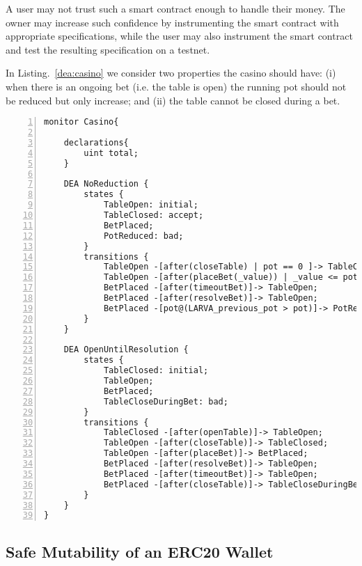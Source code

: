 \documentclass{article}
\newcommand{\tildearrow}{{\raise.37ex\hbox{$\scriptstyle\mathtt{\sim}$}}\hspace{-0.08cm}>\xspace}
\begin{document}
      A user may not trust such a smart contract enough to handle their money. The owner may increase such confidence by instrumenting the smart contract with appropriate specifications, while the user may also instrument the smart contract and test the resulting specification on a testnet.
      
      In Listing.~\ref{dea:casino} we consider two properties the casino should have: (i) when there is an ongoing bet (i.e. the table is open) the running pot should not be reduced but only increase; and (ii) the table cannot be closed during a bet.
      
        \small\begin{lstlisting}[language=DEA,basicstyle=\scriptsize,numbers=left,numbersep=2pt,xleftmargin=0.3cm,escapechar=\%,label={dea:casino},caption={Monitors that check: (i) that a game's \texttt{pot} is increasing; and (ii) a game is open until it is resolved.}]
monitor Casino{

    declarations{
        uint total;
    }

    DEA NoReduction {
        states {
            TableOpen: initial;
            TableClosed: accept;
            BetPlaced;
            PotReduced: bad;
        }
        transitions {
            TableOpen -[after(closeTable) | pot == 0 ]-> TableClosed;
            TableOpen -[after(placeBet(_value)) | _value <= pot %$\tildearrow$% total += _value;]-> BetPlaced;
            BetPlaced -[after(timeoutBet)]-> TableOpen;
            BetPlaced -[after(resolveBet)]-> TableOpen;
            BetPlaced -[pot@(LARVA_previous_pot > pot)]-> PotReduced;
        }
    }
    
    DEA OpenUntilResolution {
        states {
            TableClosed: initial;
            TableOpen;
            BetPlaced;
            TableCloseDuringBet: bad;
        }
        transitions {
            TableClosed -[after(openTable)]-> TableOpen;
            TableOpen -[after(closeTable)]-> TableClosed;
            TableOpen -[after(placeBet)]-> BetPlaced;
            BetPlaced -[after(resolveBet)]-> TableOpen;
            BetPlaced -[after(timeoutBet)]-> TableOpen;
            BetPlaced -[after(closeTable)]-> TableCloseDuringBet;
        }
    }
}
        \end{lstlisting}\normalsize
        
        
 \subsection{Safe Mutability of an ERC20 Wallet}
 
\end{document}
